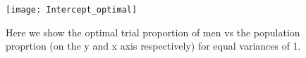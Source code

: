 \begin{figure}[ht!]
\label{fig:v2-intercept-optim}
  \centering
	\texttt{[image: Intercept\_optimal]}
	\caption{Here we show the optimal trial proportion of men vs the population proprtion (on the y and x axis respectively) for equal variances of 1.} 
\end{figure}



